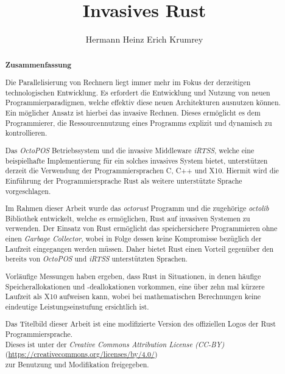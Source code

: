 \documentclass[parskip=full,12pt,a4paper,twoside,headings=openright]{scrreprt}
\title{Invasives Rust}
\author{Hermann Heinz Erich Krumrey}
\begin{document}
\begin{otherlanguage}{ngerman} %
\mytitlepage
\end{otherlanguage}

\begin{abstract}
\begin{center}\Huge\textbf{\textsf{Zusammenfassung}}
\end{center}
\vfill

Die Parallelisierung von Rechnern liegt immer mehr im Fokus der derzeitigen technologischen Entwicklung.
Es erfordert die Entwicklung und Nutzung von neuen Programmierparadigmen, welche effektiv
diese neuen Architekturen ausnutzen können. Ein möglicher Ansatz ist hierbei das
invasive Rechnen. Dieses ermöglicht es dem Programmierer, die Ressourcennutzung
eines Programms explizit und dynamisch zu kontrollieren.

Das \textit{OctoPOS} Betriebssystem und die invasive Middleware \textit{iRTSS},
welche eine beispielhafte Implementierung für ein solches
invasives System bietet, unterstützen derzeit die Verwendung der Programmiersprachen
C, C++ und X10. Hiermit wird die Einführung der Programmiersprache Rust als
weitere unterstützte Sprache vorgeschlagen.

Im Rahmen dieser Arbeit wurde das \textit{octorust} Programm und die zugehörige \textit{octolib} Bibliothek
entwickelt, welche es ermöglichen, Rust auf invasiven Systemen zu verwenden. Der Einsatz von Rust
ermöglicht das speichersichere Programmieren ohne einen \textit{Garbage Collector}, wobei in Folge dessen
keine Kompromisse bezüglich der Laufzeit eingegangen werden müssen. Daher bietet Rust einen
Vorteil gegenüber den bereits von \textit{OctoPOS} und \textit{iRTSS} unterstützten Sprachen.

Vorläufige Messungen haben ergeben, dass Rust in Situationen, in denen häufige Speicherallokationen und
-deallokationen vorkommen, eine über zehn mal kürzere Laufzeit als X10 aufweisen kann, wobei bei mathematischen
Berechnungen keine eindeutige Leistungseinstufung ersichtlich ist.

\vfill

\tiny
Das Titelbild dieser Arbeit ist eine modifizierte Version des offiziellen Logos der Rust Programmiersprache. \\
Dieses ist unter der \textit{Creative Commons Attribution License (CC-BY)}
(\url{https://creativecommons.org/licenses/by/4.0/}) \\
zur Benutzung und Modifikation freigegeben.

\end{abstract}
\end{document}
